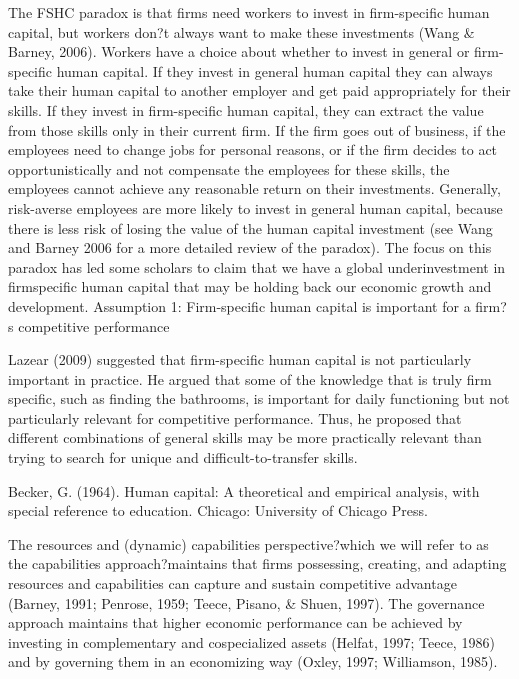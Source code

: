 \documentclass[12pt,letterpaper]{article}
\begin{document}
The FSHC paradox is that firms need workers
to invest in firm-specific human capital, but workers
don?t always want to make these investments
(Wang & Barney, 2006).
Workers have a choice about
whether to invest in general or firm-specific human
capital. If they invest in general human capital they
can always take their human capital to another employer
and get paid appropriately for their skills. If
they invest in firm-specific human capital, they can
extract the value from those skills only in their current
firm. If the firm goes out of business, if the employees
need to change jobs for personal reasons, or if
the firm decides to act opportunistically and not
compensate the employees for these skills, the employees
cannot achieve any reasonable return on
their investments. Generally, risk-averse employees
are more likely to invest in general human capital,
because there is less risk of losing the value of the
human capital investment (see Wang and Barney
2006 for a more detailed review of the paradox). The
focus on this paradox has led some scholars to claim
that we have a global underinvestment in firmspecific
human capital that may be holding back our
economic growth and development.
Assumption 1: Firm-specific human capital is
important for a firm?s competitive performance

Lazear (2009) suggested that firm-specific human
capital is not particularly important in practice. He
argued that some of the knowledge that is truly firm
specific, such as finding the bathrooms, is important
for daily functioning but not particularly relevant
for competitive performance. Thus, he proposed
that different combinations of general skills may be
more practically relevant than trying to search for
unique and difficult-to-transfer skills.

Becker, G. (1964). Human capital: A theoretical and empirical
analysis, with special reference to education.
Chicago: University of Chicago Press.

The resources and (dynamic) capabilities
perspective?which we will refer to as the capabilities
approach?maintains that firms possessing, creating,
and adapting resources and capabilities can capture
and sustain competitive advantage (Barney, 1991;
Penrose, 1959; Teece, Pisano, & Shuen, 1997). The governance
approach maintains that higher economic
performance can be achieved by investing in
complementary and cospecialized assets (Helfat,
1997; Teece, 1986) and by governing them in an economizing way (Oxley, 1997; Williamson, 1985).
\end{document}
